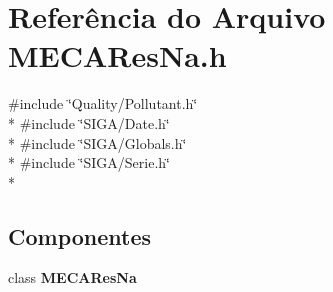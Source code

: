 \section{Referência do Arquivo M\+E\+C\+A\+Res\+Na.\+h}
\label{_m_e_c_a_res_na_8h}
{\ttfamily \#include \char`\"{}Quality/\+Pollutant.\+h\char`\"{}}\\*
{\ttfamily \#include \char`\"{}S\+I\+G\+A/\+Date.\+h\char`\"{}}\\*
{\ttfamily \#include \char`\"{}S\+I\+G\+A/\+Globals.\+h\char`\"{}}\\*
{\ttfamily \#include \char`\"{}S\+I\+G\+A/\+Serie.\+h\char`\"{}}\\*
\subsection*{Componentes}
\begin{DoxyCompactItemize}
\item 
class {\bf M\+E\+C\+A\+Res\+Na}
\end{DoxyCompactItemize}
